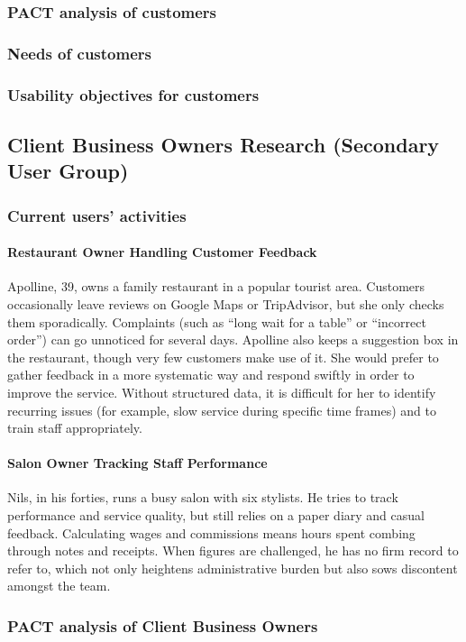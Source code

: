 \documentclass[]{VUMIFTemplateClass}
\newcommand{\subsubsubsection}[1]{\paragraph{#1}}
\begin{document}
\subsubsection{PACT analysis of customers}

\subsubsection{Needs of customers}

\subsubsection{Usability objectives for customers}

\subsection{Client Business Owners Research (Secondary User Group)}

\subsubsection{Current users' activities}

\subsubsubsection{Restaurant Owner Handling Customer Feedback}

Apolline, 39, owns a family restaurant in a popular tourist area. Customers
occasionally leave reviews on Google Maps or TripAdvisor, but she only checks
them sporadically. Complaints (such as “long wait for a table” or “incorrect
order”) can go unnoticed for several days. Apolline also keeps a suggestion box
in the restaurant, though very few customers make use of it. She would prefer to
gather feedback in a more systematic way and respond swiftly in order to improve
the service. Without structured data, it is difficult for her to identify
recurring issues (for example, slow service during specific time frames) and to
train staff appropriately.

\subsubsubsection{Salon Owner Tracking Staff Performance}

Nils, in his forties, runs a busy salon with six stylists. He tries to track
performance and service quality, but still relies on a paper diary and casual
feedback. Calculating wages and commissions means hours spent combing through
notes and receipts. When figures are challenged, he has no firm record to refer
to, which not only heightens administrative burden but also sows discontent
amongst the team.

\subsubsection{PACT analysis of Client Business Owners}
\end{document}
